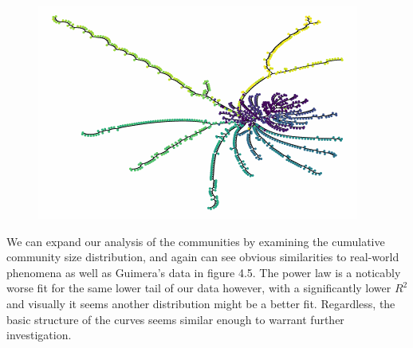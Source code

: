 \documentclass[12pt,twoside]{report}
\begin{document}
\begin{figure}[H]
\begin{center}
\begin{minipage}{0.45\linewidth}
\end{minipage}%
\hfill
\begin{minipage}{0.45\linewidth}
\includegraphics[width=\linewidth]{figures/1500_dendro.png}
\end{minipage}
\end{center}
\end{figure}

We can expand our analysis of the communities by examining the cumulative community size distribution, and again can see obvious similarities to real-world phenomena as well as Guimera's data in figure 4.5. The power law is a noticably worse fit for the same lower tail of our data however, with a significantly lower $R^2$ and visually it seems another distribution might be a better fit. Regardless, the basic structure of the curves seems similar enough to warrant further investigation. \\
\end{document}
